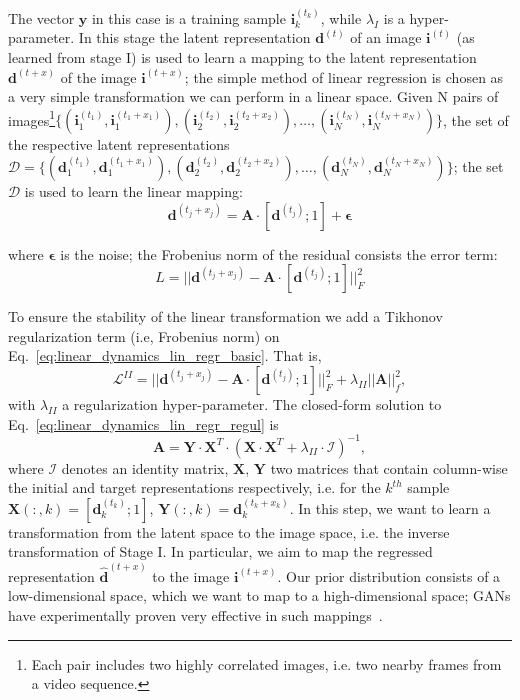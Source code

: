 \documentclass[10pt,twocolumn,letterpaper]{article}
\begin{document}
The vector $\bm{y}$ in this case is a training sample $\bm{i}_k^{(t_k)}$, while $\lambda_{I}$ is a hyper-parameter.
In this stage the latent representation $\bm{d}^{(t)}$ of an image $\bm{i}^{(t)}$ (as learned from stage I) is used to learn a mapping to the latent representation $\bm{d}^{(t + x)}$ of the image $\bm{i}^{(t + x)}$; the simple method of linear regression is chosen as a very simple transformation we can perform in a linear space. Given N pairs of images\footnote{Each pair includes two highly correlated images, i.e. two nearby frames from a video sequence.}$\{(\bm{i}_1^{(t_1)}, \bm{i}_1^{(t_1 + x_1)}), (\bm{i}_2^{(t_2)}, \bm{i}_2^{(t_2 + x_2)}), \ldots, (\bm{i}_N^{(t_N)}, \bm{i}_N^{(t_N + x_N)})\}$, the set of the respective latent representations $\bm{\mathcal{D}} = \{(\bm{d}_1^{(t_1)}, \bm{d}_1^{(t_1 + x_1)}), (\bm{d}_2^{(t_2)}, \bm{d}_2^{(t_2 + x_2)}), \ldots, (\bm{d}_N^{(t_N)}, \bm{d}_N^{(t_N + x_N)})\}$; the set $\bm{\mathcal{D}}$ is used to learn the linear mapping:
\begin{equation}
    \bm{d}^{(t_j + x_j)} = \bm{A}\cdot[\bm{d}^{(t_j)}; 1] + \bm{\epsilon}
\end{equation}

where $\bm{\epsilon}$ is the noise; the Frobenius norm of the residual consists the error term: 
\begin{equation}
    L = ||\bm{d}^{(t_j + x_j)} - \bm{A}\cdot[\bm{d}^{(t_j)}; 1]||_F^2
    \label{eq:linear_dynamics_lin_regr_basic}
\end{equation}

To ensure the stability of the linear transformation we add a Tikhonov regularization term (i.e, Frobenius norm)  on Eq.~\ref{eq:linear_dynamics_lin_regr_basic}. That is,
\begin{equation}
    \mathcal{L}^{II} = ||\bm{d}^{(t_j + x_j)} - \bm{A}\cdot[\bm{d}^{(t_j)}; 1]||_F^2 + \lambda_{II} ||\bm{A}||_f^2,
    \label{eq:linear_dynamics_lin_regr_regul}
\end{equation}%
with $\lambda_{II}$ a regularization hyper-parameter. The closed-form solution to Eq.~\ref{eq:linear_dynamics_lin_regr_regul} is 
\begin{equation}
    \bm{A} = \bm{Y} \cdot \bm{X}^T \cdot (\bm{X}\cdot\bm{X}^T + \lambda_{II} \cdot \bm{\mathcal{I}})^{-1},
    \label{eq:linear_dynamics_lin_regr_solution_a}
\end{equation}%
where $\bm{\mathcal{I}}$ denotes an identity matrix, $\bm{X}$, $\bm{Y}$ two matrices that contain column-wise the initial and target representations respectively, i.e. for the $k^{th}$ sample  $\bm{X}(:, k) = [\bm{d}_k^{(t_k)}; 1]$, $\bm{Y}(:, k) = \bm{d}_k^{(t_k + x_k)}$.
In this step, we want to learn a transformation from the latent space to the image space, i.e. the inverse transformation of Stage I. In particular, we aim to map the regressed representation $\hat{\bm{d}}^{(t + x)}$ to the image $\bm{i}^{(t + x)}$. Our prior distribution consists of a low-dimensional space, which we want to map to a high-dimensional space; GANs have experimentally proven very effective in such mappings~\cite{ledig2016photo, pathak2016context}. 
\end{document}
